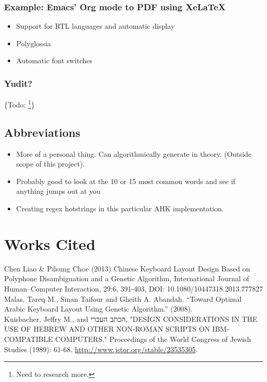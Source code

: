 \documentclass[11pt]{article}
\begin{document}
\subsubsection{Example: Emacs' Org mode to PDF using XeLaTeX}
\label{sec:org8260013}

\begin{itemize}
\item Support for RTL languages and automatic display
\item Polyglossia
\item Automatic font switches
\end{itemize}

\subsubsection{Yudit?}
\label{sec:orgbfe2678}

\{Todo: \footnote{Need to research more.}\}

\subsection{Abbreviations}
\label{sec:org5197d94}

\begin{itemize}
\item More of a personal thing. Can algorithmically generate in theory. (Outside scope of this project).
\item Probably good to look at the 10 or 15 most common words and see if anything jumps out at you
\item Creating regex hotstrings in this particular AHK implementation.
\end{itemize}

\section{Works Cited}
\label{sec:org38d0fd9}

Chen Liao \& Pilsung Choe (2013) Chinese Keyboard Layout Design Based on Polyphone Disambiguation and a Genetic Algorithm, International Journal of Human–Computer Interaction, 29:6, 391-403, DOI: 10.1080/10447318.2013.777827 \\

Malas, Tareq M., Sinan Taifour and Gheith A. Abandah. “Toward Optimal Arabic Keyboard Layout Using Genetic Algorithm.” (2008). \\

Knisbacher, Jeffry M., and \texthebrew{הכתב העברי}, "DESIGN CONSIDERATIONS IN THE USE OF HEBREW AND OTHER NON-ROMAN SCRIPTS ON IBM-COMPATIBLE COMPUTERS." Proceedings of the World Congress of Jewish Studies (1989): 61-68. \url{http://www.jstor.org/stable/23535305}. \\
\end{document}
